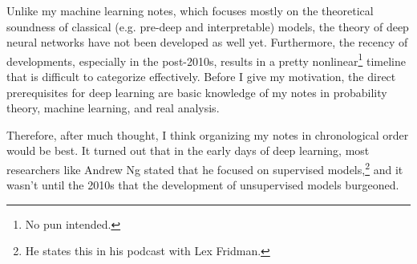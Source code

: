 Unlike my machine learning notes, which focuses mostly on the theoretical soundness of classical (e.g. pre-deep and interpretable) models, the theory of deep neural networks have not been developed as well yet. Furthermore, the recency of developments, especially in the post-2010s, results in a pretty nonlinear\footnote{No pun intended.} timeline that is difficult to categorize effectively. Before I give my motivation, the direct prerequisites for deep learning are basic knowledge of my notes in probability theory, machine learning, and real analysis. 

Therefore, after much thought, I think organizing my notes in chronological order would be best. It turned out that in the early days of deep learning, most researchers like Andrew Ng stated that he focused on supervised models,\footnote{He states this in his podcast with Lex Fridman.} and it wasn't until the 2010s that the development of unsupervised models burgeoned. 

